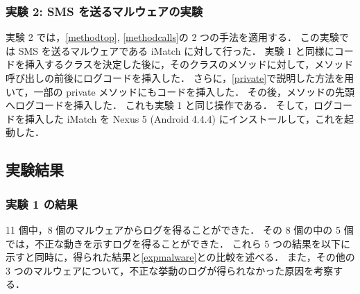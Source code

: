 \subsubsection{実験 2: SMS  を送るマルウェアの実験}
\label{exp2}
実験 2 では，\ref{methodtop}, \ref{methodcalls}の 2 つの手法を適用する．
この実験では SMS を送るマルウェアである iMatch に対して行った．
実験 1 と同様にコードを挿入するクラスを決定した後に，そのクラスのメソッドに対して，メソッド呼び出しの前後にログコードを挿入した．
さらに，\ref{private}で説明した方法を用いて，一部の private メソッドにもコードを挿入した．
その後，メソッドの先頭へログコードを挿入した．
これも実験 1 と同じ操作である．
そして，ログコードを挿入した iMatch を Nexus 5 (Android 4.4.4) にインストールして，これを起動した．

\subsection{実験結果}
\subsubsection{実験 1 の結果}
11 個中，8 個のマルウェアからログを得ることができた．
その 8 個の中の 5 個では，不正な動きを示すログを得ることができた．
これら 5 つの結果を以下に示すと同時に，得られた結果と\ref{expmalware}との比較を述べる．
また，その他の 3 つのマルウェアについて，不正な挙動のログが得られなかった原因を考察する．

